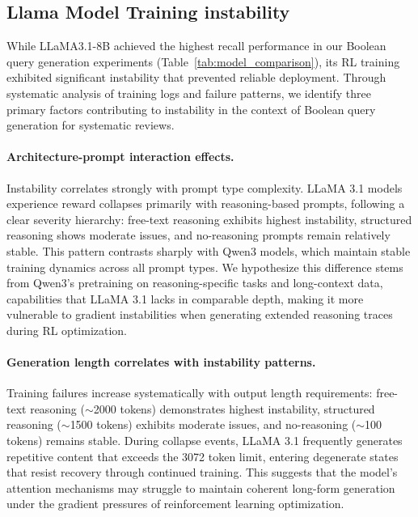 \subsection{Llama Model Training instability}


\label{appendix:llama-instability}
While LLaMA3.1-8B achieved the highest recall performance in our Boolean query generation experiments (Table~\ref{tab:model_comparison}), its RL training exhibited significant instability that prevented reliable deployment. 
Through systematic analysis of training logs and failure patterns, we identify three primary factors contributing to instability in the context of Boolean query generation for systematic reviews.


\paragraph{Architecture-prompt interaction effects.} Instability correlates strongly with prompt type complexity. LLaMA 3.1 models experience reward collapses primarily with reasoning-based prompts, following a clear severity hierarchy: free-text reasoning exhibits highest instability, structured reasoning shows moderate issues, and no-reasoning prompts remain relatively stable. This pattern contrasts sharply with Qwen3 models, which maintain stable training dynamics across all prompt types. We hypothesize this difference stems from Qwen3's pretraining on reasoning-specific tasks and long-context data, capabilities that LLaMA 3.1 lacks in comparable depth, making it more vulnerable to gradient instabilities when generating extended reasoning traces during RL optimization.


\paragraph{Generation length correlates with instability patterns.} Training failures increase systematically with output length requirements: free-text reasoning ($\sim$2000 tokens) demonstrates highest instability, structured reasoning ($\sim$1500 tokens) exhibits moderate issues, and no-reasoning ($\sim$100 tokens) remains stable. During collapse events, LLaMA 3.1 frequently generates repetitive content that exceeds the 3072 token limit, entering degenerate states that resist recovery through continued training. This suggests that the model's attention mechanisms may struggle to maintain coherent long-form generation under the gradient pressures of reinforcement learning optimization.

